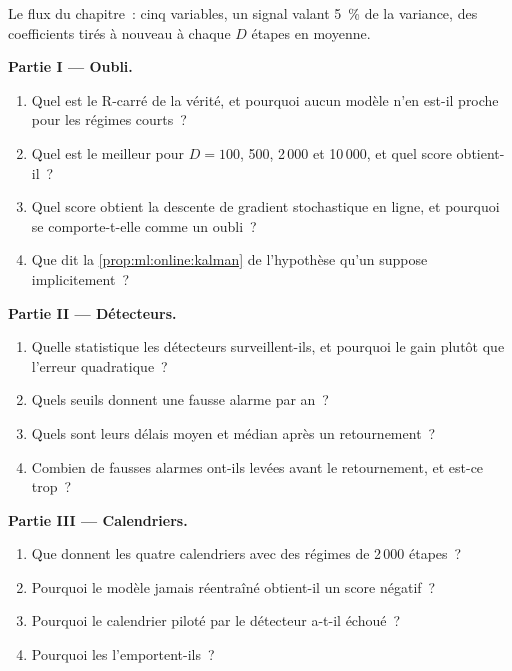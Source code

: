 \begin{problem}\label{pb:ml:online-learning-and-drift:1}
Le flux du chapitre~: cinq variables, un signal valant 5~\% de la variance, des coefficients tirés à nouveau à chaque $D$ étapes en moyenne.

\medskip\noindent\textbf{Partie I --- Oubli.}
\begin{enumerate}
\item Quel est le R-carré de la vérité, et pourquoi aucun modèle n'en est-il proche pour les régimes courts~?
\item Quel  est le meilleur pour $D = 100$, 500, 2\,000 et 10\,000, et quel score obtient-il~?
\item Quel score obtient la descente de gradient stochastique en ligne, et pourquoi se comporte-t-elle comme un oubli~?
\item Que dit la \cref{prop:ml:online:kalman} de l'hypothèse qu'un  suppose implicitement~?
\end{enumerate}

\medskip\noindent\textbf{Partie II --- Détecteurs.}
\begin{enumerate}[resume]
\item Quelle statistique les détecteurs surveillent-ils, et pourquoi le gain plutôt que l'erreur quadratique~?
\item Quels seuils donnent une fausse alarme par an~?
\item Quels sont leurs délais moyen et médian après un retournement~?
\item Combien de fausses alarmes ont-ils levées avant le retournement, et est-ce trop~?
\end{enumerate}

\medskip\noindent\textbf{Partie III --- Calendriers.}
\begin{enumerate}[resume]
\item Que donnent les quatre calendriers avec des régimes de 2\,000 étapes~?
\item Pourquoi le modèle jamais réentraîné obtient-il un score négatif~?
\item Pourquoi le calendrier piloté par le détecteur a-t-il échoué~?
\item Pourquoi les  l'emportent-ils~?
\end{enumerate}


\end{problem}
